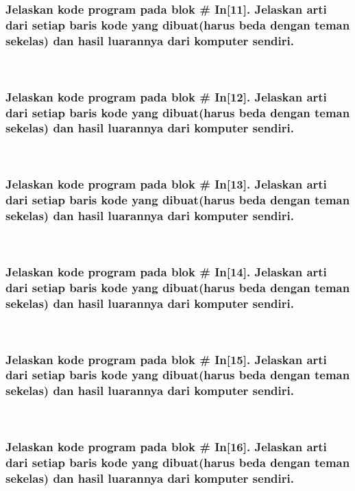 	\subsubsection{Jelaskan kode program pada blok \# In[11]. Jelaskan arti dari setiap baris kode yang dibuat(harus beda dengan teman sekelas) dan hasil luarannya dari komputer sendiri.}
	\hfill\\
 
	\subsubsection{Jelaskan kode program pada blok \# In[12]. Jelaskan arti dari setiap baris kode yang dibuat(harus beda dengan teman sekelas) dan hasil luarannya dari komputer sendiri.}
	\hfill\\

	\subsubsection{Jelaskan kode program pada blok \# In[13]. Jelaskan arti dari setiap baris kode yang dibuat(harus beda dengan teman sekelas) dan hasil luarannya dari komputer sendiri.}
	\hfill\\
	
	\subsubsection{Jelaskan kode program pada blok \# In[14]. Jelaskan arti dari setiap baris kode yang dibuat(harus beda dengan teman sekelas) dan hasil luarannya dari komputer sendiri.}
	\hfill\\
	
	\subsubsection{Jelaskan kode program pada blok \# In[15]. Jelaskan arti dari setiap baris kode yang dibuat(harus beda dengan teman sekelas) dan hasil luarannya dari komputer sendiri.}
	\hfill\\
	
	\subsubsection{Jelaskan kode program pada blok \# In[16]. Jelaskan arti dari setiap baris kode yang dibuat(harus beda dengan teman sekelas) dan hasil luarannya dari komputer sendiri.}
	\hfill\\
	
